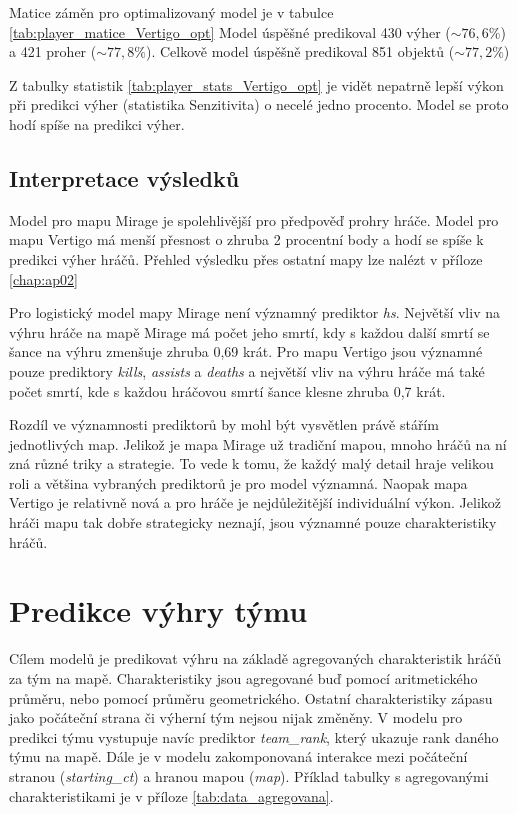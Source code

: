 

Matice záměn pro optimalizovaný model je v tabulce \ref{tab:player_matice_Vertigo_opt}
Model úspěšné predikoval 430 výher ($\sim 76,6\%$) a 421 proher ($\sim 77,8\%$). Celkově model úspěšně predikoval 851 objektů ($\sim 77,2\%$)



Z tabulky statistik \ref{tab:player_stats_Vertigo_opt} je vidět nepatrně lepší výkon při predikci výher (statistika Senzitivita) o necelé jedno procento.
Model se proto hodí spíše na predikci výher.

\subsection{Interpretace výsledků}
Model pro mapu Mirage je spolehlivější pro předpověď prohry hráče. Model pro mapu Vertigo má menší přesnost o zhruba 
2 procentní body a hodí se spíše k predikci výher hráčů.
Přehled výsledku přes ostatní mapy lze nalézt v příloze \ref{chap:ap02}

Pro logistický model mapy Mirage není významný prediktor \textit{hs}. Největší vliv na výhru hráče na mapě Mirage má počet jeho smrtí, kdy s každou další smrtí se šance
na výhru zmenšuje zhruba 0,69 krát. Pro mapu Vertigo jsou významné pouze prediktory \textit{kills}, \textit{assists} a \textit{deaths} a největší vliv na výhru hráče
má také počet smrtí, kde s každou hráčovou smrtí šance klesne zhruba 0,7 krát.

Rozdíl
ve významnosti prediktorů
by mohl být vysvětlen právě stářím jednotlivých map. Jelikož je mapa Mirage už tradiční mapou, mnoho hráčů na ní zná různé triky a strategie. To vede k tomu, že
každý malý detail hraje velikou roli a většina vybraných prediktorů je pro model významná. Naopak mapa Vertigo je relativně nová a pro hráče je nejdůležitější individuální
výkon. Jelikož hráči mapu tak dobře strategicky neznají, jsou významné pouze charakteristiky hráčů.

\newpage
\section{Predikce výhry týmu}
Cílem modelů je predikovat výhru na základě agregovaných charakteristik hráčů za tým na mapě. Charakteristiky jsou agregované buď pomocí aritmetického průměru,
nebo pomocí průměru geometrického. Ostatní charakteristiky zápasu jako počáteční strana či výherní tým nejsou nijak změněny. V modelu pro predikci týmu vystupuje
navíc prediktor \textit{team\_rank}, který ukazuje rank daného týmu na mapě. Dále je v modelu zakomponovaná interakce
mezi počáteční stranou (\textit{starting\_ct}) a hranou mapou (\textit{map}). Příklad tabulky s agregovanými charakteristikami je v příloze \ref{tab:data_agregovana}.

